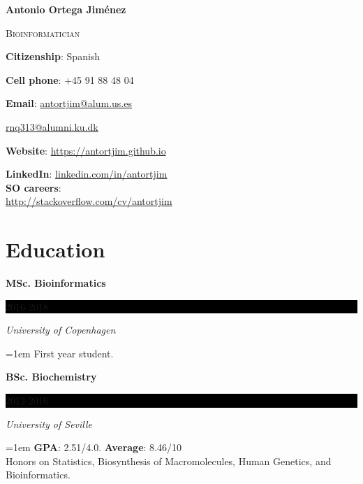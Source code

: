 \documentclass[paper=a4,fontsize=11pt]{article} %
\newcommand{\sepspace}{\vspace*{1em}}		%
\newcommand{\MyName}[1]{ %
		\Huge \usefont{OT1}{phv}{b}{n} \hfill #1
		\par \normalsize \normalfont}
\newcommand{\MySlogan}[1]{ %
		\large \usefont{OT1}{phv}{m}{n}\hfill \textit{#1}
		\par \normalsize \normalfont}
\newcommand{\NewPart}[1]{\section*{
									{#1}}}
\newcommand{\EducationEntry}[4]{
		\noindent \textbf{#1} \hfill      %
		\colorbox{Black}{%
			\parbox{6em}{%
			\hfill\color{White}#2}} \par  %
		\noindent \textit{#3} \par        %
		\noindent\hangindent=1em\hangafter=0 \small #4 %
		\normalsize \par}
\begin{document}

%

\thispagestyle{plain}
\def\name{\textcolor{StrongRed}{Antonio Ortega Jim\'enez}}

\centerline{\LARGE\bf \name}
\vspace{0.1in}
\centerline{\textcolor{awesome-red}{\textsc{Bioinformatician}}}
\vspace{0.25in}



\begin{minipage}[t]{0.65\textwidth}
  \textbf{Citizenship}: Spanish \par
  \textbf{Cell phone}: +45 91 88 48 04 \par
  \textbf{Email}: \href{mailto:antortjim@alum.us.es}{antortjim@alum.us.es} \par
  \leftskip=1.1cm  \href{mailto:rnq313@alumni.ku.dk}{rnq313@alumni.ku.dk} \par
  \leftskip=0cm \textbf{Website}: \href{https://antortjim.github.io}{https://antortjim.github.io} \par
  
\end{minipage}
\begin{minipage}[t]{0.35\textwidth}
  \textbf{LinkedIn}: \href{http://www.linkedin.com/in/antortjim}{linkedin.com/in/antortjim} \\
   \textbf{SO careers}:\\
   \href{http://stackoverflow.com/cv/antortjim}{http://stackoverflow.com/cv/antortjim} \\

\end{minipage}



\NewPart{Education}{}

\EducationEntry{MSc. Bioinformatics}{2016-2018}{University of Copenhagen}{First year student.}
\sepspace

\EducationEntry{BSc. Biochemistry}{2012-2016}{University of Seville}{\textbf{GPA}: 2.51/4.0. \textbf{Average}: 8.46/10 \\
  Honors on Statistics, Biosynthesis of Macromolecules, Human Genetics, and Bioinformatics.}
\sepspace
 
\end{document}
